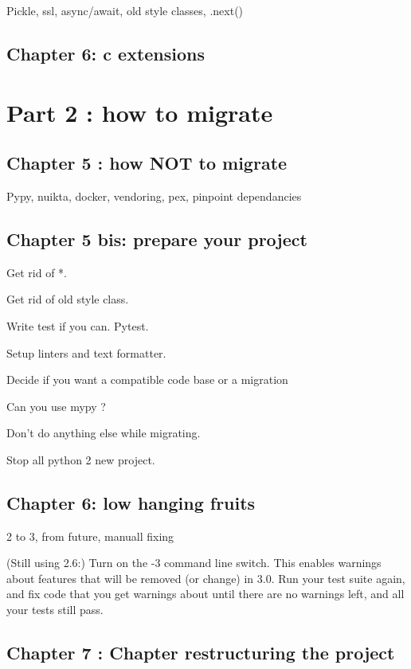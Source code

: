 \documentclass[paperwidth=8in, paperheight=10in,lang=en]{elegantbook}
\begin{document}

Pickle, ssl, async/await, old style classes, .next()

\chapter{Chapter 6:  c extensions}

\part{Part 2 : how to migrate}

\chapter{Chapter 5 : how NOT to migrate}

Pypy, nuikta, docker, vendoring, pex, pinpoint dependancies

\chapter{Chapter 5 bis: prepare your project}

Get rid of *.

Get rid of old style class.

Write test if you can. Pytest.

Setup linters and text formatter.

Decide if you want a compatible code base or a migration

Can you use mypy ?

Don't do anything else while migrating.

Stop all python 2 new project.

\chapter{Chapter 6: low hanging fruits}

2 to 3, from future, manuall fixing

(Still using 2.6:) Turn on the -3 command line switch. This enables warnings about features that will be removed (or change) in 3.0. Run your test suite again, and fix code that you get warnings about until there are no warnings left, and all your tests still pass.

\chapter{Chapter 7 : Chapter restructuring the project}
\end{document}
